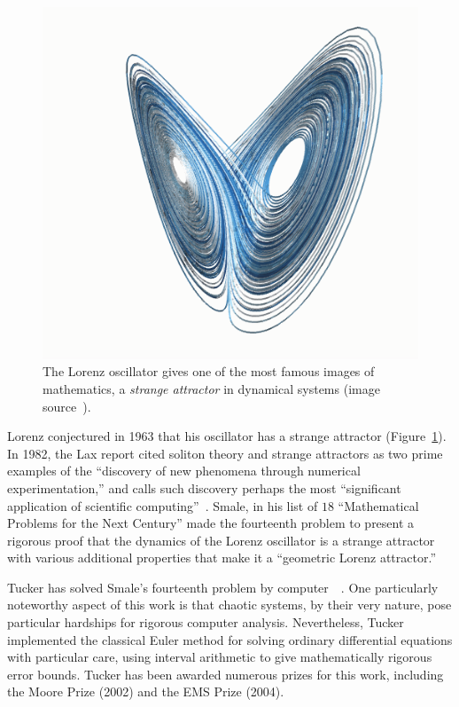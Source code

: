 \documentclass{llncs}
\begin{document}

\begin{figure}[h!]
  \centering
\includegraphics[scale=0.3]{Lorenz.png}
  \caption{The Lorenz oscillator gives one of the
most famous images of mathematics, a {\it strange attractor} in
dynamical systems (image source~\cite{Lor11}).}
\label{fig:lorenz}
\end{figure}

Lorenz conjectured in 1963 that his oscillator has a strange attractor
(Figure~\ref{fig:lorenz}).  In 1982, the Lax report cited soliton
theory and strange attractors as two prime examples of the ``discovery
of new phenomena through numerical experimentation,'' and calls such
discovery perhaps the most ``significant application of scientific
computing''~\cite{Lax}.  Smale, in his list of $18$ ``Mathematical
Problems for the Next Century'' made the fourteenth problem to present
a rigorous proof that the dynamics of the Lorenz oscillator is a
strange attractor~\cite{Sma98} with various additional properties that
make it a ``geometric Lorenz attractor.''

Tucker has solved Smale's fourteenth problem by
computer~\cite{Tuc02}~\cite{St00}.  One particularly noteworthy aspect
of this work is that chaotic systems, by their very nature, pose
particular hardships for rigorous computer analysis.  Nevertheless,
Tucker implemented the classical Euler method for solving ordinary
differential equations with particular care,  using interval
arithmetic to give mathematically rigorous error bounds.  Tucker has
been awarded numerous prizes for this work, including the Moore Prize
(2002) and the EMS Prize (2004).
\end{document}
